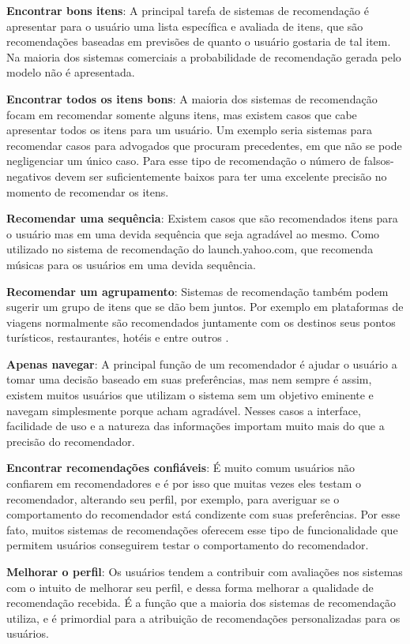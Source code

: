 \textbf{Encontrar bons itens}: A principal tarefa de sistemas de recomendação é apresentar para o usuário uma lista específica e avaliada de itens, que são recomendações baseadas em previsões de quanto o usuário gostaria de tal item. Na maioria dos sistemas comerciais a probabilidade de recomendação gerada pelo modelo não é apresentada.

\textbf{Encontrar todos os itens bons}: A maioria dos sistemas de recomendação focam em recomendar somente alguns itens, mas existem casos que cabe apresentar todos os itens para um usuário. Um exemplo seria sistemas para recomendar casos para advogados que procuram precedentes, em que não se pode negligenciar um único caso. Para esse tipo de recomendação o número de falsos-negativos devem ser suficientemente baixos para ter uma excelente precisão no momento de recomendar os itens.

\textbf{Recomendar uma sequência}: Existem casos que são recomendados itens para o usuário mas em uma devida sequência que seja agradável ao mesmo. Como utilizado no sistema de recomendação do launch.yahoo.com, que recomenda músicas para os usuários em uma devida sequência.

\textbf{Recomendar um agrupamento}: Sistemas de recomendação também podem sugerir um grupo de itens que se dão bem juntos. Por exemplo em plataformas de viagens normalmente são recomendados juntamente com os destinos seus pontos turísticos, restaurantes, hotéis e entre outros \cite{Ricci:2010}.

\textbf{Apenas navegar}: A principal função de um recomendador é ajudar o usuário a tomar uma decisão baseado em suas preferências, mas nem sempre é assim, existem muitos usuários que utilizam o sistema sem um objetivo eminente e navegam simplesmente porque acham agradável. Nesses casos a interface, facilidade de uso e a natureza das informações importam muito mais do que a precisão do recomendador.

\textbf{Encontrar recomendações confiáveis}: É muito comum usuários não confiarem em recomendadores e é por isso que muitas vezes eles testam o recomendador, alterando seu perfil, por exemplo, para averiguar se o comportamento do recomendador está condizente com suas preferências. Por esse fato, muitos sistemas de recomendações oferecem esse tipo de funcionalidade que permitem usuários conseguirem testar o comportamento do recomendador.

\textbf{Melhorar o perfil}: Os usuários tendem a contribuir com avaliações nos sistemas com o intuito de melhorar seu perfil, e dessa forma melhorar a qualidade de recomendação recebida. É a função que a maioria dos sistemas de recomendação utiliza, e é primordial para a atribuição de recomendações personalizadas para os usuários.

